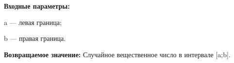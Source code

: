 \textbf{Входные параметры:}

 a --- левая граница;
  
 b --- правая граница.

\textbf{Возвращаемое значение:}
Случайное вещественное число в интервале [a;b].